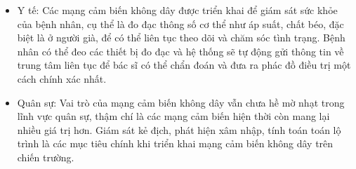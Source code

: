 \begin{itemize}
\item Y tế: Các mạng cảm biến không dây được triển khai để giám sát sức khỏe của bệnh nhân, cụ thể là đo đạc thông số cơ thể như áp suất, chất béo, đặc biệt là ở người già, để có thể liên tục theo dõi và chăm sóc tình trạng. Bệnh nhân có thể đeo các thiết bị đo đạc và hệ thống sẽ tự động gửi thông tin về trung tâm liên tục để bác sĩ có thể chẩn đoán và đưa ra phác đồ điều trị một cách chính xác nhất.
\item Quân sự: Vai trò của mạng cảm biến không dây vẫn chưa hề mờ nhạt trong lĩnh vực quân sự, thậm chí là các mạng cảm biến hiện thời còn mang lại nhiều giá trị hơn. Giám sát kẻ địch, phát hiện xâm nhập, tính toán toán lộ trình là các mục tiêu chính khi triển khai mạng cảm biến không dây trên chiến trường.
\end{itemize}

